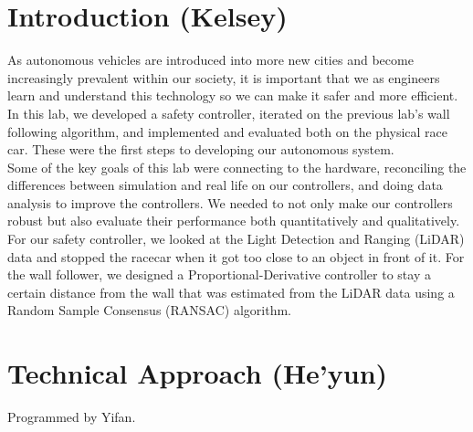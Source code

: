 \documentclass{article}
\begin{document}

\section{Introduction (Kelsey)}
As autonomous vehicles are introduced into more new cities and become increasingly prevalent within our society, it is important that we as engineers learn and understand this technology so we can make it safer and more efficient. In this lab, we developed a safety controller, iterated on the previous lab’s wall following algorithm, and implemented and evaluated both on the physical race car. These were the first steps to developing our autonomous system. \\

Some of the key goals of this lab were connecting to the hardware, reconciling the differences between simulation and real life on our controllers, and doing data analysis to improve the controllers. We needed to not only make our controllers robust but also evaluate their performance both quantitatively and qualitatively. \\

For our safety controller, we looked at the Light Detection and Ranging (LiDAR) data and stopped the racecar when it got too close to an object in front of it. For the wall follower, we designed a Proportional-Derivative controller to stay a certain distance from the wall that was estimated from the LiDAR data using a Random Sample Consensus (RANSAC) algorithm. \\


\section{Technical Approach (He'yun)}
Programmed by Yifan. 
\end{document}
